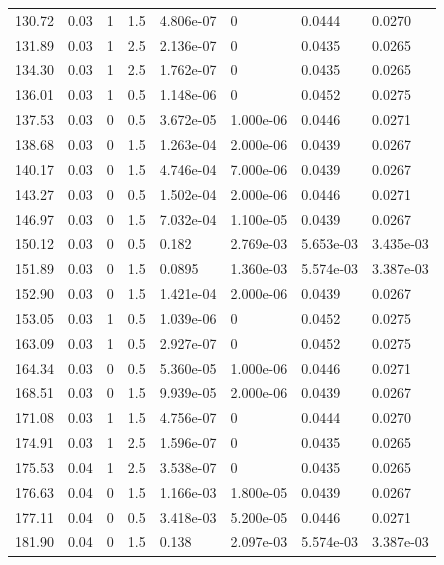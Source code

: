 \documentclass[preview]{standalone}
\begin{document}
{{{\begin{tabular}{L{1.2cm}C{1.2cm} C{0.3cm}C{0.5cm} C{1.4cm}C{1.4cm} C{1.4cm}C{1.4cm}}
  130.72  &  0.03  & 1     & 1.5 &  4.806e-07  & 0  & 0.0444 &  0.0270   \\ 
  131.89  &  0.03  & 1     & 2.5 &  2.136e-07  & 0  & 0.0435 &  0.0265   \\ 
  134.30  &  0.03  & 1     & 2.5 &  1.762e-07  & 0  & 0.0435 &  0.0265   \\ 
  136.01  &  0.03  & 1     & 0.5 &  1.148e-06  & 0  & 0.0452 &  0.0275   \\ 
  137.53  &  0.03  & 0     & 0.5 &  3.672e-05  & 1.000e-06  & 0.0446 &  0.0271   \\ 
  138.68  &  0.03  & 0     & 1.5 &  1.263e-04  & 2.000e-06  & 0.0439 &  0.0267   \\ 
  140.17  &  0.03  & 0     & 1.5 &  4.746e-04  & 7.000e-06  & 0.0439 &  0.0267   \\ 
  143.27  &  0.03  & 0     & 0.5 &  1.502e-04  & 2.000e-06  & 0.0446 &  0.0271   \\ 
  146.97  &  0.03  & 0     & 1.5 &  7.032e-04  & 1.100e-05  & 0.0439 &  0.0267   \\ 
  150.12  &  0.03  & 0     & 0.5 &  0.182  & 2.769e-03  & 5.653e-03 &  3.435e-03   \\ 
  151.89  &  0.03  & 0     & 1.5 &  0.0895  & 1.360e-03  & 5.574e-03 &  3.387e-03   \\ 
  152.90  &  0.03  & 0     & 1.5 &  1.421e-04  & 2.000e-06  & 0.0439 &  0.0267   \\ 
  153.05  &  0.03  & 1     & 0.5 &  1.039e-06  & 0  & 0.0452 &  0.0275   \\ 
  163.09  &  0.03  & 1     & 0.5 &  2.927e-07  & 0  & 0.0452 &  0.0275   \\ 
  164.34  &  0.03  & 0     & 0.5 &  5.360e-05  & 1.000e-06  & 0.0446 &  0.0271   \\ 
  168.51  &  0.03  & 0     & 1.5 &  9.939e-05  & 2.000e-06  & 0.0439 &  0.0267   \\ 
  171.08  &  0.03  & 1     & 1.5 &  4.756e-07  & 0  & 0.0444 &  0.0270   \\ 
  174.91  &  0.03  & 1     & 2.5 &  1.596e-07  & 0  & 0.0435 &  0.0265   \\ 
  175.53  &  0.04  & 1     & 2.5 &  3.538e-07  & 0  & 0.0435 &  0.0265   \\ 
  176.63  &  0.04  & 0     & 1.5 &  1.166e-03  & 1.800e-05  & 0.0439 &  0.0267   \\ 
  177.11  &  0.04  & 0     & 0.5 &  3.418e-03  & 5.200e-05  & 0.0446 &  0.0271   \\ 
  181.90  &  0.04  & 0     & 1.5 &  0.138  & 2.097e-03  & 5.574e-03 &  3.387e-03   \\ 

\end{tabular}}}}
\end{document}

